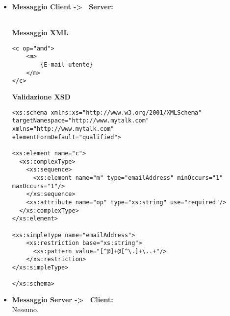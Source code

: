 {{\begin{itemize}
			\item[] \textbf{Messaggio Client -\textgreater~ Server:}{\\
			\textbf{Messaggio XML}\\
				\begin{lstlisting}
<c op="amd">
	<m>
		{E-mail utente}
	</m>
</c>
				\end{lstlisting}
				\textbf{Validazione XSD}\\
				\begin{lstlisting}
<xs:schema xmlns:xs="http://www.w3.org/2001/XMLSchema"
targetNamespace="http://www.mytalk.com"
xmlns="http://www.mytalk.com"
elementFormDefault="qualified">

<xs:element name="c">
  <xs:complexType>
    <xs:sequence>
      <xs:element name="m" type="emailAddress" minOccurs="1" maxOccurs="1"/>
    </xs:sequence>
    <xs:attribute name="op" type="xs:string" use="required"/>
  </xs:complexType>
</xs:element>

<xs:simpleType name="emailAddress"> 
    <xs:restriction base="xs:string"> 
      <xs:pattern value="[^@]+@[^\.]+\..+"/> 
    </xs:restriction> 
</xs:simpleType>

</xs:schema>
				\end{lstlisting}
				}
				
				\item[] \textbf{Messaggio Server -\textgreater~ Client:}\\
				Nessuno.
		\end{itemize}
	}%
}

